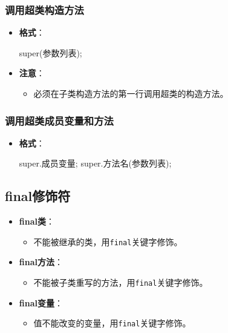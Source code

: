 \documentclass[a4paper, 10pt]{ctexart}
\begin{document}
\subsubsection{调用超类构造方法}
\begin{itemize}
  \item \textbf{格式}：
  \begin{codeblock}
super(参数列表);
  \end{codeblock}
  \item \textbf{注意}：
  \begin{itemize}
    \item 必须在子类构造方法的第一行调用超类的构造方法。
  \end{itemize}
\end{itemize}

\subsubsection{调用超类成员变量和方法}
\begin{itemize}
  \item \textbf{格式}：
  \begin{codeblock}
super.成员变量;
super.方法名(参数列表);
  \end{codeblock}
\end{itemize}

\subsection{final修饰符}
\begin{itemize}
  \item \textbf{final类}：
  \begin{itemize}
    \item 不能被继承的类，用\texttt{final}关键字修饰。
  \end{itemize}
  \item \textbf{final方法}：
  \begin{itemize}
    \item 不能被子类重写的方法，用\texttt{final}关键字修饰。
  \end{itemize}
  \item \textbf{final变量}：
  \begin{itemize}
    \item 值不能改变的变量，用\texttt{final}关键字修饰。
  \end{itemize}
\end{itemize}
\end{document}
